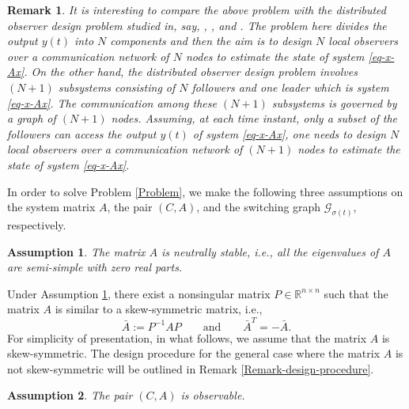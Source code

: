 \documentclass[twocolumn]{autart}
\newcommand{\RR}{\mathbb{R}}
\newtheorem{Assumption}{Assumption}
\newtheorem{Remark}{Remark}
\begin{document}
\begin{Remark}
  It is interesting to compare the above problem with the distributed observer design problem studied in, say,
  \cite{SuHuang12Cyber}, \cite{CaiHuang16}, and \cite{LTHuang19}.
  The problem here divides the output $y(t)$ into $N$ components and then the aim is to design  $N$
  local observers over a communication network of $N$ nodes to estimate the state of system \eqref{eq-x-Ax}.
  On the other hand, the distributed observer design problem involves $(N+1)$
  subsystems consisting of $N$ followers and one leader which is system \eqref{eq-x-Ax}.
  The communication among these $(N+1)$ subsystems is governed by a graph of $(N+1)$ nodes.
 Assuming, at each time instant, only a subset of the followers can access the output $y(t)$ of system \eqref{eq-x-Ax},
 one needs to design $N$ local observers  over a communication network of $(N+1)$ nodes to estimate the state of system \eqref{eq-x-Ax}.
\end{Remark}


In order to solve Problem \ref{Problem}, we make the following three assumptions
on the system matrix $A$, the pair $(C,A)$, and the switching graph $\mathcal{G}_{\sigma(t)}$, respectively.




\begin{Assumption}\label{Ass-A-neutral}
The matrix $A$ is neutrally stable, i.e., all the eigenvalues of $A$ are semi-simple with zero real parts.
\end{Assumption}



Under Assumption \ref{Ass-A-neutral}, there exist a nonsingular matrix $P \in \RR^{n \times n}$ such that
  the matrix $A$ is similar to a skew-symmetric matrix, i.e.,
  \begin{equation*}
    \bar{A}:=P^{-1}AP \qquad \text{and} \qquad \bar{A}^{T}=-\bar{A}.
  \end{equation*}
For simplicity of presentation, in what follows, we assume that the matrix $A$ is skew-symmetric.
The design procedure for the general case where the matrix $A$ is not skew-symmetric
will be outlined in Remark \ref{Remark-design-procedure}.




\begin{Assumption}\label{Ass-observable}
  The pair $(C,A)$ is observable.
\end{Assumption}
\end{document}
